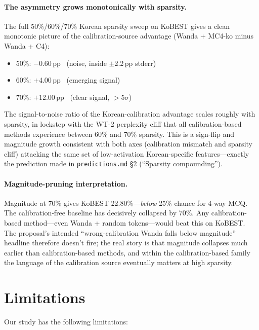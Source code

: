 \documentclass{article}
\begin{document}
\paragraph{The asymmetry grows monotonically with sparsity.} The full
50\%/60\%/70\% Korean sparsity sweep on KoBEST gives a clean monotonic
picture of the calibration-source advantage (Wanda + MC4-ko minus Wanda
+ C4):
\begin{itemize}
  \item 50\%: $-$0.60\,pp ~(noise, inside $\pm$2.2\,pp stderr)
  \item 60\%: $+$4.00\,pp ~(emerging signal)
  \item 70\%: $+$12.00\,pp ~(clear signal, $>$5$\sigma$)
\end{itemize}
The signal-to-noise ratio of the Korean-calibration advantage scales
roughly with sparsity, in lockstep with the WT-2 perplexity cliff that
all calibration-based methods experience between 60\% and 70\%
sparsity. This is a sign-flip and magnitude growth consistent with both
axes (calibration mismatch and sparsity cliff) attacking the same set
of low-activation Korean-specific features---exactly the prediction
made in \texttt{predictions.md} \S2 (``Sparsity compounding'').

\paragraph{Magnitude-pruning interpretation.} Magnitude at 70\% gives
KoBEST 22.80\%---\emph{below} 25\% chance for 4-way MCQ. The
calibration-free baseline has decisively collapsed by 70\%. Any
calibration-based method---even Wanda + random tokens---would beat
this on KoBEST. The proposal's intended ``wrong-calibration Wanda
falls below magnitude'' headline therefore doesn't fire; the real story
is that magnitude collapses much earlier than calibration-based methods,
and within the calibration-based family the language of the calibration
source eventually matters at high sparsity.

\section{Limitations}

Our study has the following limitations:
\end{document}
